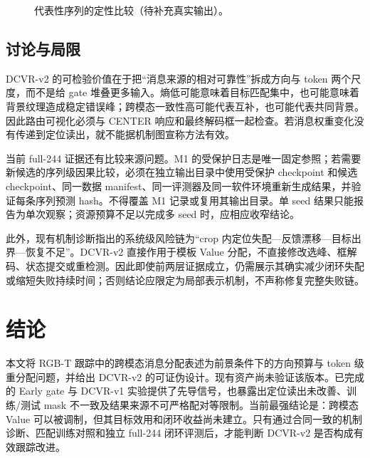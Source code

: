 \documentclass[journal]{IEEEtran}
\begin{document}
\begin{figure}[!t]
\centering
{}
\caption{代表性序列的定性比较（待补充真实输出）。}
\label{fig:qualitative}
\end{figure}

\subsection{讨论与局限}
DCVR-v2 的可检验价值在于把“消息来源的相对可靠性”拆成方向与 token 两个尺度，而不是给 gate 堆叠更多输入。熵低可能意味着目标匹配集中，也可能意味着背景纹理造成稳定错误峰；跨模态一致性高可能代表互补，也可能代表共同背景。因此路由可视化必须与 CENTER 响应和最终解码框一起检查。若消息权重变化没有传递到定位读出，就不能据机制图宣称方法有效。

当前 full-244 证据还有比较来源问题。M1 的受保护日志是唯一固定参照；若需要新候选的序列级因果比较，必须在独立输出目录中使用受保护 checkpoint 和候选 checkpoint、同一数据 manifest、同一评测器及同一软件环境重新生成结果，并验证每条序列预测 hash。不得覆盖 M1 记录或复用其输出目录。单 seed 结果只能报告为单次观察；资源预算不足以完成多 seed 时，应相应收窄结论。

此外，现有机制诊断指出的系统级风险链为“crop 内定位失配—反馈漂移—目标出界—恢复不足”。DCVR-v2 直接作用于模板 Value 分配，不直接修改选峰、框解码、状态提交或重检测。因此即使前两层证据成立，仍需展示其确实减少闭环失配或缩短失败持续时间；否则结论应限定为局部表示机制，不声称修复完整失败链。

\clearpage
\section{结论}
本文将 RGB-T 跟踪中的跨模态消息分配表述为前景条件下的方向预算与 token 级重分配问题，并给出 DCVR-v2 的可证伪设计。现有资产尚未验证该版本。已完成的 Early gate 与 DCVR-v1 实验提供了先导信号，也暴露出定位读出未改善、训练/测试 mask 不一致及结果来源不可严格配对等限制。当前最强结论是：跨模态 Value 可以被调制，但其目标效用和闭环收益尚未建立。只有通过合同一致的机制诊断、匹配训练对照和独立 full-244 闭环评测后，才能判断 DCVR-v2 是否构成有效跟踪改进。

\balance


\end{document}
